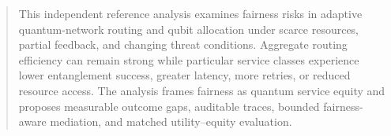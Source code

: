 \begin{abstract}
This independent reference analysis examines fairness risks in adaptive quantum-network routing and qubit allocation under scarce resources, partial feedback, and changing threat conditions. Aggregate routing efficiency can remain strong while particular service classes experience lower entanglement success, greater latency, more retries, or reduced resource access. The analysis frames fairness as quantum service equity and proposes measurable outcome gaps, auditable traces, bounded fairness-aware mediation, and matched utility--equity evaluation.
\end{abstract}
